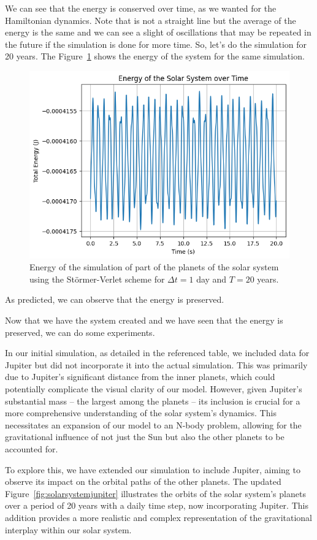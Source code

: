 \documentclass{article}
\begin{document}
We can see that the energy is conserved over time, as we wanted for the Hamiltonian dynamics. Note that is not a straight line but the average of the energy is the same and we can see a slight of oscillations that may be repeated in the future if the simulation is done for more time. So, let's do the simulation for 20 years. The Figure~\ref{fig:solarsystemenergy2} shows the energy of the system for the same simulation.

\begin{figure}[H]
	\centering
	\includegraphics[width=0.5\linewidth]{./Figures/SolarSystem/energy2.png}
	\caption{Energy of the simulation of part of the planets of the solar system using the Störmer-Verlet scheme for \(\Delta t = 1\) day and \(T = 20\) years.}
	\label{fig:solarsystemenergy2}
\end{figure}

As predicted, we can observe that the energy is preserved.

Now that we have the system created and we have seen that the energy is preserved, we can do some experiments. 

\label{sec:expanding_n_body_problem}

In our initial simulation, as detailed in the referenced table, we included data for Jupiter but did not incorporate it into the actual simulation. This was primarily due to Jupiter's significant distance from the inner planets, which could potentially complicate the visual clarity of our model. However, given Jupiter's substantial mass – the largest among the planets – its inclusion is crucial for a more comprehensive understanding of the solar system's dynamics. This necessitates an expansion of our model to an N-body problem, allowing for the gravitational influence of not just the Sun but also the other planets to be accounted for.

To explore this, we have extended our simulation to include Jupiter, aiming to observe its impact on the orbital paths of the other planets. The updated Figure~\ref{fig:solarsystemjupiter} illustrates the orbits of the solar system's planets over a period of 20 years with a daily time step, now incorporating Jupiter. This addition provides a more realistic and complex representation of the gravitational interplay within our solar system.
\end{document}
